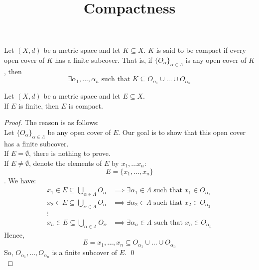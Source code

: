 \documentclass[a4paper]{article}
\date{}
\title{\flushleft \textbf{Compactness}}
\begin{document}
	\maketitle
	
	\begin{definition}[Compact]
		Let $(X,d)$ be a metric space and let $K \subseteq X$. $K$ is said to be compact if every open cover of $K$ has a finite subcover. That is, if $\{O_\alpha\}_{\alpha \in \Lambda}$ is any open cover of $K$, then
		$$\exists \alpha_1, ..., \alpha_n \text{ such that } K \subseteq O_{\alpha_1} \cup ... \cup O_{\alpha_n} $$
	\end{definition}
	
	\begin{example}
		Let $(X,d)$ be a metric space and let $E \subseteq X$. \\
		If $E$ is finite, then $E$ is compact.
	\end{example}
	\begin{proof}
	The reason is as follows:\\
	Let $\{O_\alpha\}_{\alpha \in \Lambda}$ be any open cover of $E$. Our goal is to show that this open cover has a finite subcover. \\
	If $E= \emptyset$, there is nothing to prove. \\
	If $E \not = \emptyset$, denote the elements of $E$ by $x_1,...x_n:$ $$E=\{x_1,...,x_n\}$$.
	We have:
	\begin{align*}
		x_1 \in E \subseteq \bigcup \limits_{\alpha \in \Lambda} O_\alpha &\implies \exists \alpha_1 \in \Lambda \text { such that } x_1 \in O_{\alpha_1} \\
		x_2 \in E \subseteq \bigcup \limits_{\alpha \in \Lambda} O_\alpha &\implies \exists \alpha_2\in \Lambda \text { such that } x_2 \in O_{\alpha_2} \\
		\vdots \\
		x_n \in E \subseteq \bigcup \limits_{\alpha \in \Lambda} O_\alpha &\implies \exists \alpha_n\in \Lambda \text { such that } x_n \in O_{\alpha_n} 
	\end{align*}
	Hence,
	$$E = {x_1, ..., x_n} \subseteq O_{\alpha_1} \cup ... \cup O_{\alpha_n}$$
	So, $O_{\alpha_1},...,O_{\alpha_n}$ is a finite subcover of $E$. \qed \\
	\end{proof}
	
\end{document}
